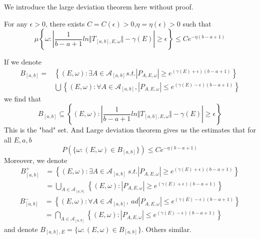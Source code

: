 We introduce the large deviation theorem here without proof.\cite{bucaj2017localization}
\begin{lemma}
  For any $\epsilon>0$, there exists $C=C(\epsilon)>0$,$\eta=\eta(\epsilon)>0$ such that
  \[
  \mu \left\{ \omega:\left\vert \frac{1}{b-a+1} ln\Vert T_{[a,b],E,\omega}\Vert-\gamma(E) \right\vert\geq\epsilon
   \right\} \leq Ce^{-\eta (b-a+1)}
  \]
\end{lemma}
\begin{remark}
  If we denote
\[
\begin{split}
    B_{[a,b]}=&\left\{(E,\omega):\exists A\in\mathcal{A}_{[a,b]} s.t. |P_{A,E,\omega}|\geq e^{(\gamma(E)+\epsilon)(b-a+1)}\right\} \\
    &\bigcup \left\{(E,\omega):\forall A\in\mathcal{A}_{[a,b]}, |P_{A,E,\omega}|\leq e^{(\gamma(E)-\epsilon)(b-a+1)}\right\}
\end{split}
\]
  we find that
  \[
    B_{[a,b]}\subseteq\left\{(E,\omega):\left\vert\frac{1}{b-a+1} ln\Vert T_{[a,b],E,\omega}\Vert-\gamma(E)\right\vert \geq\epsilon \right\}
  \]
  This is the "bad" set. And Large deviation theorem gives us the estimates that for all $E,a,b$
\begin{equation}\label{ldt}
  P(\{\omega:(E,\omega)\in B_{[a,b]}\})\leq Ce^{-\eta(b-a+1)}
\end{equation}
Moreover, we denote
\begin{equation}\label{B+}
  \begin{split}
    B_{[a,b]}^{+}&=\left\{(E,\omega):\exists A\in\mathcal{A}_{[a,b]}~s.t. |P_{A,E,\omega}|\geq e^{(\gamma(E)+\epsilon)(b-a+1)}\right\}\\
    &=\bigcup_{A\in\mathcal{A}_{[a,b]}}\left\{(E,\omega):|P_{A,E,\omega}|\geq e^{(\gamma(E)+\epsilon)(b-a+1)}\right\}
  \end{split}
\end{equation}
\begin{equation}\label{B-}
  \begin{split}
    B_{[a,b]}^{-}&=\left\{(E,\omega):\forall A\in\mathcal{A}_{[a,b]},~ad|P_{A,E,\omega}|\leq e^{(\gamma(E)-\epsilon)(b-a+1)}\right\}\\
    &=\bigcap_{A\in\mathcal{A}_{[a,b]}}\left\{(E,\omega):|P_{A,E,\omega}|\leq e^{(\gamma(E)-\epsilon)(b-a+1)}\right\}
  \end{split}
\end{equation}
and denote $B_{[a,b],E}=\{\omega:(E,\omega)\in B_{[a,b]}\}$. Others similar.
\end{remark}

